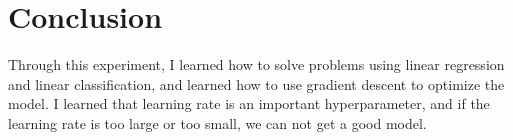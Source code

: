 \documentclass[journal, a4paper]{IEEEtran}
\begin{document}




\section{Conclusion}

    Through this experiment, I learned how to solve problems using linear regression and linear classification, and learned how to use gradient descent to optimize the model. I learned that learning rate is an important hyperparameter, and if the learning rate is too large or too small, we can not get a good model.


\end{document}
